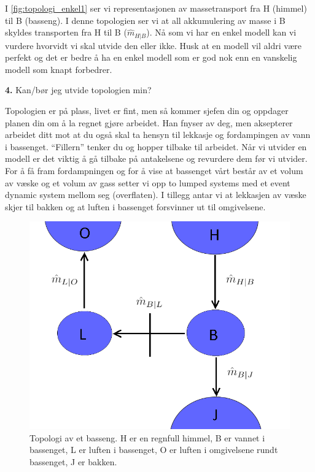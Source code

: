 I \cref{fig:topologi_enkel1} ser vi representasjonen av massetransport fra H (himmel) til B (basseng). I denne topologien ser vi at all akkumulering av masse i B skyldes transporten fra H til B ($\hat{m}_{H|B}$). Nå som vi har en enkel modell kan vi vurdere hvorvidt vi skal utvide den eller ikke. Husk at en modell vil aldri være perfekt og det er bedre å ha en enkel modell som er god nok enn en vanskelig  modell som knapt forbedrer.  

\begin{center}
    \textbf{4.} Kan/bør jeg utvide topologien min?
\end{center}

 Topologien er på plass, livet er fint, men så kommer sjefen din og oppdager planen din om å la regnet gjøre arbeidet. Han fnyser av deg, men aksepterer  arbeidet ditt mot at du også skal ta hensyn til lekkasje og fordampingen av vann i bassenget. ``Fillern'' tenker du og hopper tilbake til arbeidet. Når vi utvider en modell er det viktig å gå tilbake på antakelsene og revurdere dem før vi utvider. For å få fram fordampningen og for å vise at bassenget vårt består av et volum av væske og et volum av gass setter vi opp to lumped systems med et event dynamic system mellom seg (overflaten). I tillegg antar vi at lekkasjen av væske skjer til bakken og at luften i bassenget forsvinner ut til omgivelsene.  
 
 \begin{figure}[H]
     \centering
     \includegraphics[scale=0.3]{Figures/Basseng2.png}
     \caption{Topologi av et basseng. H er en regnfull himmel, B er vannet i bassenget, L er luften i bassenget, O er luften i omgivelsene rundt bassenget, J er bakken.}
     \label{fig:basseng_vanskelig}
 \end{figure}

